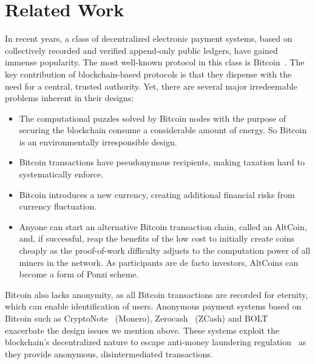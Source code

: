 \documentclass[sigconf, authordraft]{acmart}
\begin{document}
\section{Related Work}


In recent years, a class of decentralized electronic payment systems,
based on collectively recorded and verified append-only public
ledgers, have gained immense popularity.  The most well-known protocol
in this class is Bitcoin~\cite{nakamoto2008bitcoin}.  The key
contribution of blockchain-based protocols is that they dispense with
the need for a central, trusted authority.  Yet, there are several
major irredeemable problems inherent in their designs:

\begin{itemize}
  \item The computational puzzles solved by Bitcoin nodes with the purpose
    of securing the blockchain consume a considerable amount of energy.
    So Bitcoin is an environmentally irresponsible design.
  \item Bitcoin transactions have pseudonymous recipients, making taxation
    hard to systematically enforce.
  \item Bitcoin introduces a new currency, creating additional
    financial risks from currency fluctuation.
  \item Anyone can start an alternative Bitcoin transaction chain,
    called an AltCoin, and, if successful, reap the benefits of the low
    cost to initially create coins cheaply as the proof-of-work
    difficulty adjusts to the computation power of all
    miners in the network.  As participants are de facto investors,
    AltCoins can become a form of Ponzi scheme.
\end{itemize}

Bitcoin also lacks anonymity, as all Bitcoin transactions are recorded
for eternity, which can enable identification of users.  Anonymous
payment systems based on Bitcoin such as CryptoNote~\cite{cryptonote}
(Monero), Zerocash~\cite{zerocash} (ZCash) and BOLT~\cite{BOLT}
exacerbate the design issues we mention above.  These systems exploit the
blockchain's decentralized nature to escape anti-money laundering
regulation~\cite{molander1998cyberpayments} as they provide anonymous,
disintermediated transactions.
\end{document}
